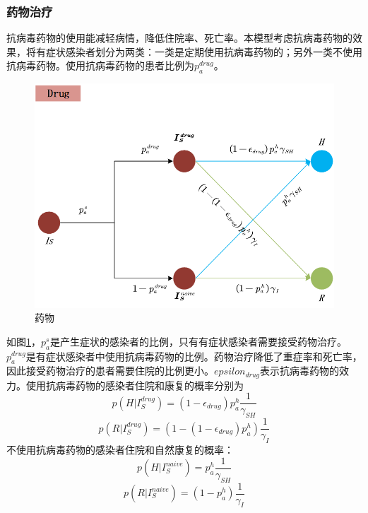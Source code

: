 \documentclass[bwprint]{gmcmthesis}
\numberwithin{figure}{section}
\begin{document}
\subsubsection{药物治疗}
抗病毒药物的使用能减轻病情，降低住院率、死亡率。本模型考虑抗病毒药物的效果，将有症状感染者划分为两类：一类是定期使用抗病毒药物的；另外一类不使用抗病毒药物。使用抗病毒药物的患者比例为$p_a^{drug}$。
\begin{figure}[!h]
\centering
\includegraphics[width=.75\textwidth]{Drug.png}
\caption{药物}
\label{drug}
\end{figure}
\par 如图\ref{drug}，$p_a^s$是产生症状的感染者的比例，只有有症状感染者需要接受药物治疗。$p_a^{drug}$是有症状感染者中使用抗病毒药物的比例。药物治疗降低了重症率和死亡率，因此接受药物治疗的患者需要住院的比例更小。$epsilon_{drug}$表示抗病毒药物的效力。使用抗病毒药物的感染者住院和康复的概率分别为
\begin{equation}
p(H\vert I_S^{drug})=(1-\epsilon_{drug})p_a^h\frac{1}{\gamma_{SH}}
\end{equation}
\begin{equation}
p(R\vert I_S^{drug})=(1-(1-\epsilon_{drug})p_a^h)\frac{1}{\gamma_I}
\end{equation}
不使用抗病毒药物的感染者住院和自然康复的概率：
\begin{equation}
p(H\vert I_S^{naive})=p_a^h\frac{1}{\gamma_{SH}}
\end{equation}
\begin{equation}
p(R\vert I_S^{naive})=(1-p_a^h)\frac{1}{\gamma_I}
\end{equation}
\end{document}
